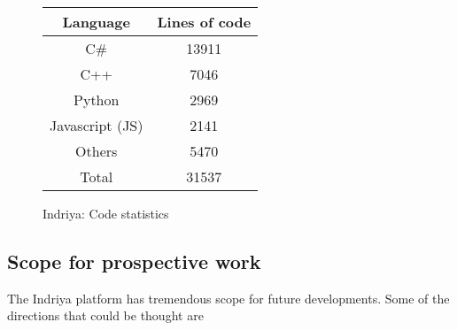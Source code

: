 \begin{figure}[!ht]
  \qquad
  \begin{tabular}[b]{|c|c|}\hline
Language & Lines of code \\ \hline 
C\# & 13911\\ 
C++ & 7046\\ 
Python & 2969\\ 
Javascript (JS) & 2141\\ 
Others & 5470\\ 
\hline 
 Total & 31537\\ \hline 
  \end{tabular}
  \caption{Indriya: Code statistics}
    \label{fig:code_stats}
\end{figure}

\subsection{Scope for prospective work}
  The Indriya platform has tremendous scope for future developments. Some of the directions that could be thought are

